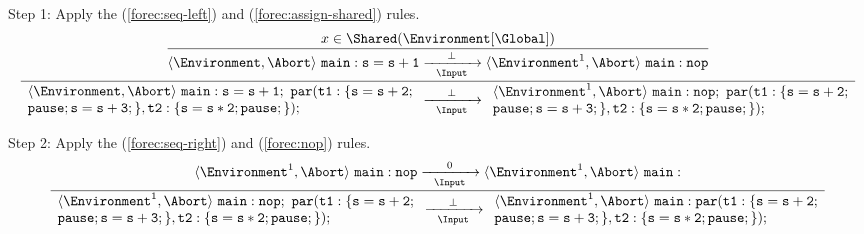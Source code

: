 \noindent
Step 1: Apply the (\ref{forec:seq-left}) and (\ref{forec:assign-shared}) rules. 
\begin{equation*}
	\frac{
		\dfrac{
				x \in \Shared(\Environment[\Global])
			}{
				\langle \Environment, \Abort \rangle ~ \mathtt{main: s=s+1}
					\xrightarrow[~~\Input~~]{\bot} 
				\langle \Environment^1, \Abort \rangle ~ \mathtt{main: nop}
			}
		}{
			\begin{array}{l}
				\langle \Environment, \Abort \rangle ~ \mathtt{main: s=s+1;~par( t1:\{s=s+2;}	\\
				\mathtt{pause; s=s+3;\}, t2:\{s=s*2; pause;\} );}								\\
			\end{array}
				\xrightarrow[~~\Input~~]{\bot} 
			\begin{array}{l}
				\langle \Environment^1, \Abort \rangle ~ \mathtt{main: nop;~par( t1:\{s=s+2;}	\\
				\mathtt{pause; s=s+3;\}, t2:\{s=s*2; pause;\} );}								\\
			\end{array}
		}
\end{equation*}

\noindent
Step 2: Apply the (\ref{forec:seq-right}) and (\ref{forec:nop}) rules. 
\begin{equation*}
	\frac{
			\langle \Environment^1, \Abort \rangle ~ \mathtt{main: nop}
				\xrightarrow[~~\Input~~]{0} 
			\langle \Environment^1, \Abort \rangle ~ \mathtt{main: }
		}{
			\begin{array}{l}
				\langle \Environment^1, \Abort \rangle ~ \mathtt{main: nop;~par( t1:\{s=s+2;}	\\
				\mathtt{pause; s=s+3;\}, t2:\{s=s*2; pause;\} );}								\\
			\end{array}
				\xrightarrow[~~\Input~~]{\bot} 
			\begin{array}{l}
				\langle \Environment^1, \Abort \rangle ~ \mathtt{main: par( t1:\{s=s+2;}		\\
				\mathtt{pause; s=s+3;\}, t2:\{s=s*2; pause;\} );}								\\
			\end{array}
		}
\end{equation*}

